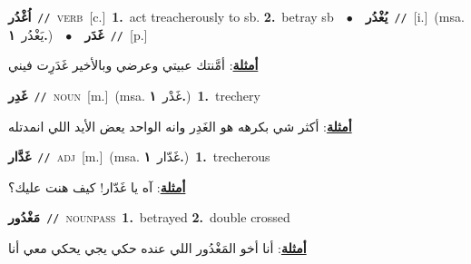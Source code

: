 \documentclass[10pt,a4paper,twoside]{article} %
\begin{document}
\begin{multicols}{2}
{{{{{\setlength\topsep{0pt}\textbf{\foreignlanguage{arabic}{اُغْدُر}}\ {\color{gray}\texttt{//}\color{black}}\ \textsc{verb}\ [c.]\ \textbf{1.}~act treacherously to sb.  \textbf{2.}~betray sb\ \ $\bullet$\ \ \setlength\topsep{0pt}\textbf{\foreignlanguage{arabic}{يُغْدُر}}\ {\color{gray}\texttt{//}\color{black}}\ [i.]\ \color{gray}(msa. \foreignlanguage{arabic}{يَغْدُر}~\foreignlanguage{arabic}{\textbf{١.}})\color{black}\ \ $\bullet$\ \ \setlength\topsep{0pt}\textbf{\foreignlanguage{arabic}{غَدَر}}\ {\color{gray}\texttt{//}\color{black}}\ [p.]\  \begin{flushright}\color{gray}\foreignlanguage{arabic}{\textbf{\underline{\foreignlanguage{arabic}{أمثلة}}}: أمَّنتك عبيتي وعرضي وبالأخير غَدَرِت فيني}\end{flushright}\color{black}} \vspace{2mm}

{\setlength\topsep{0pt}\textbf{\foreignlanguage{arabic}{غَدِر}}\ {\color{gray}\texttt{//}\color{black}}\ \textsc{noun}\ [m.]\ \color{gray}(msa. \foreignlanguage{arabic}{غَدْر}~\foreignlanguage{arabic}{\textbf{١.}})\color{black}\ \textbf{1.}~trechery\  \begin{flushright}\color{gray}\foreignlanguage{arabic}{\textbf{\underline{\foreignlanguage{arabic}{أمثلة}}}: أكثر شي بكرهه هو الغَدِر وانه الواحد يعض الأيد اللي انمدتله}\end{flushright}\color{black}} \vspace{2mm}

{\setlength\topsep{0pt}\textbf{\foreignlanguage{arabic}{غَدَّار}}\ {\color{gray}\texttt{//}\color{black}}\ \textsc{adj}\ [m.]\ \color{gray}(msa. \foreignlanguage{arabic}{غَدّار}~\foreignlanguage{arabic}{\textbf{١.}})\color{black}\ \textbf{1.}~trecherous\  \begin{flushright}\color{gray}\foreignlanguage{arabic}{\textbf{\underline{\foreignlanguage{arabic}{أمثلة}}}: آه يا غَدّار! كيف هنت عليك؟}\end{flushright}\color{black}} \vspace{2mm}

{\setlength\topsep{0pt}\textbf{\foreignlanguage{arabic}{مَغْدُور}}\ {\color{gray}\texttt{//}\color{black}}\ \textsc{noun\textunderscore pass}\ \textbf{1.}~betrayed  \textbf{2.}~double crossed\  \begin{flushright}\color{gray}\foreignlanguage{arabic}{\textbf{\underline{\foreignlanguage{arabic}{أمثلة}}}: أنا أخو المَغْدُور اللي عنده حكي يجي يحكي معي أنا}\end{flushright}\color{black}} \vspace{2mm}

}}}}
\end{multicols}
\end{document}
